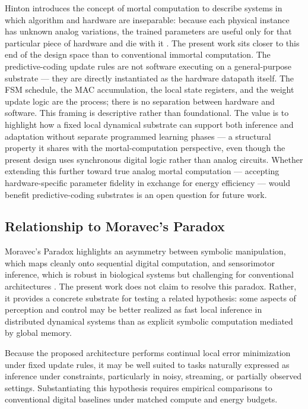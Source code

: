 \documentclass{article}
\begin{document}
Hinton introduces the concept of mortal computation to describe systems in which algorithm and hardware are inseparable: because each physical instance has unknown analog variations, the trained parameters are useful only for that particular piece of hardware and die with it \cite{hinton2022forward}. The present work sits closer to this end of the design space than to conventional immortal computation. The predictive-coding update rules are not software executing on a general-purpose substrate --- they are directly instantiated as the hardware datapath itself. The FSM schedule, the MAC accumulation, the local state registers, and the weight update logic are the process; there is no separation between hardware and software.
This framing is descriptive rather than foundational. The value is to highlight how a fixed local dynamical substrate can support both inference and adaptation without separate programmed learning phases --- a structural property it shares with the mortal-computation perspective, even though the present design uses synchronous digital logic rather than analog circuits. Whether extending this further toward true analog mortal computation --- accepting hardware-specific parameter fidelity in exchange for energy efficiency --- would benefit predictive-coding substrates is an open question for future work.

\subsection{Relationship to Moravec's Paradox}

Moravec's Paradox highlights an asymmetry between symbolic manipulation, which maps cleanly onto sequential digital computation, and sensorimotor inference, which is robust in biological systems but challenging for conventional architectures \cite{moravec1988mind}. The present work does not claim to resolve this paradox. Rather, it provides a concrete substrate for testing a related hypothesis: some aspects of perception and control may be better realized as fast local inference in distributed dynamical systems than as explicit symbolic computation mediated by global memory.

Because the proposed architecture performs continual local error minimization under fixed update rules, it may be well suited to tasks naturally expressed as inference under constraints, particularly in noisy, streaming, or partially observed settings. Substantiating this hypothesis requires empirical comparisons to conventional digital baselines under matched compute and energy budgets.
\end{document}
